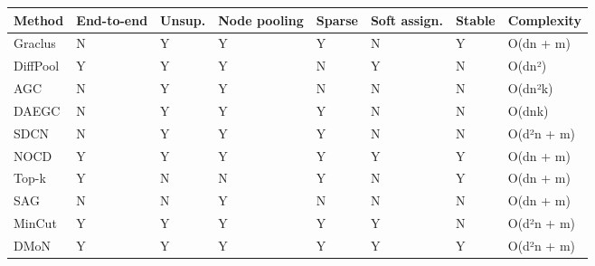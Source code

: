 \documentclass[
]{article}
\begin{document}
\begin{longtable}[]{@{}
  >{\raggedright\arraybackslash}p{}
  >{\raggedright\arraybackslash}p{}
  >{\raggedright\arraybackslash}p{}
  >{\raggedright\arraybackslash}p{}
  >{\raggedright\arraybackslash}p{}
  >{\raggedright\arraybackslash}p{}
  >{\raggedright\arraybackslash}p{}
  >{\raggedright\arraybackslash}p{}@{}}
\toprule\noalign{}
\begin{minipage}[b]{\linewidth}\raggedright
Method
\end{minipage} & \begin{minipage}[b]{\linewidth}\raggedright
End-to-end
\end{minipage} & \begin{minipage}[b]{\linewidth}\raggedright
Unsup.
\end{minipage} & \begin{minipage}[b]{\linewidth}\raggedright
Node pooling
\end{minipage} & \begin{minipage}[b]{\linewidth}\raggedright
Sparse
\end{minipage} & \begin{minipage}[b]{\linewidth}\raggedright
Soft assign.
\end{minipage} & \begin{minipage}[b]{\linewidth}\raggedright
Stable
\end{minipage} & \begin{minipage}[b]{\linewidth}\raggedright
Complexity
\end{minipage} \\
\midrule\noalign{}
\endhead
\bottomrule\noalign{}
\endlastfoot
Graclus & N & Y & Y & Y & N & Y & O(dn + m) \\
DiffPool & Y & Y & Y & N & Y & N & O(dn²) \\
AGC & N & Y & Y & N & N & N & O(dn²k) \\
DAEGC & N & Y & Y & Y & N & N & O(dnk) \\
SDCN & N & Y & Y & Y & N & N & O(d²n + m) \\
NOCD & Y & Y & Y & Y & Y & Y & O(dn + m) \\
Top-k & Y & N & N & Y & N & Y & O(dn + m) \\
SAG & N & N & Y & N & N & N & O(dn + m) \\
MinCut & Y & Y & Y & Y & Y & N & O(d²n + m) \\
DMoN & Y & Y & Y & Y & Y & Y & O(d²n + m) \\
\end{longtable}
\end{document}

